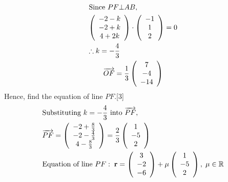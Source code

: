 \documentclass[12pt, a4 paper]{article}
\begin{document}
\begin{outline}[enumerate]
				\[\begin{gathered}
					{\text{Since }}PF \bot AB, \hfill \\
					\left( {\begin{array}{*{20}{c}}
						{ - 2 - k} \\
						{ - 2 + k} \\
						{4 + 2k}
						\end{array}} \right) \cdot \left( {\begin{array}{*{20}{c}}
						{ - 1} \\
						1 \\
						2
						\end{array}} \right) = 0 \hfill \\
					\therefore k =  - \frac{4}{3} \hfill \\
					\overrightarrow {OF} = \frac{1}{3}\left( {\begin{array}{*{20}{c}}
							7 \\
							-4 \\
							{ - 14}
							\end{array}} \right)
					\end{gathered}\]
									\color{black}
									\2 Hence, find the equation of line $PF$.\hfill[3]
									\color{blue}
					\[\begin{gathered}
					{\text{Substituting }}k =  - \frac{4}{3}{\text{ into }}\overrightarrow {PF} , \hfill \\
					\overrightarrow {PF}  = \left( {\begin{array}{*{20}{c}}
						{ - 2 + \frac{8}{3}} \\
						{ - 2 - \frac{4}{3}} \\
						{4 - \frac{8}{3}}
						\end{array}} \right) = \frac{2}{3}\left( {\begin{array}{*{20}{c}}
						1 \\
						{ - 5} \\
						2
						\end{array}} \right) \hfill \\
					{\text{Equation of line }}PF:\;{\mathbf{r}} = \left( {\begin{array}{*{20}{c}}
						3 \\
						{ - 2} \\
						{ - 6}
						\end{array}} \right) + \mu \left( {\begin{array}{*{20}{c}}
						1 \\
						{ - 5} \\
						2
						\end{array}} \right),\;\mu  \in \mathbb{R} \hfill \\
					\end{gathered}\]



\end{outline}
\end{document}
